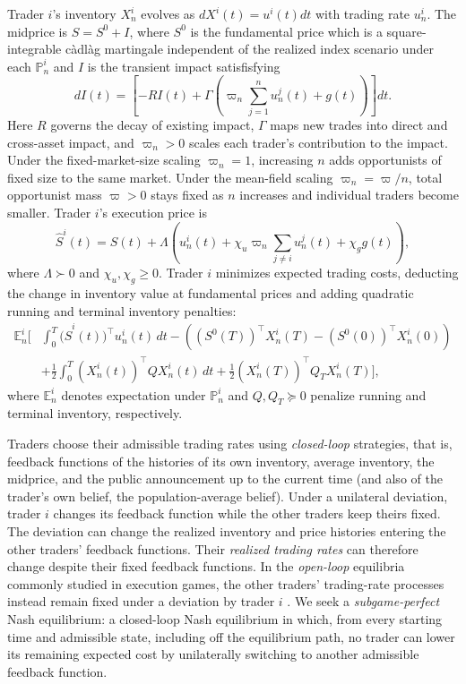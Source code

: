 \documentclass[12pt]{article}
\numberwithin{equation}{section}
\theoremstyle{definition}
\begin{document}
Trader \(i\)'s inventory \(X_n^i\) evolves as \(dX^i(t)=u^i(t)dt\) with trading rate \(u_n^i\).
The midprice is \(S=S^0+I\), where \(S^0\) is the fundamental price which is a square-integrable c\`adl\`ag
martingale independent of the realized index scenario under each \(\mathbb P_n^i\) and
\(I\) is the transient impact satisfisfying
\begin{equation}\label{eq:intro_dynamics}
dI(t)=\left[-RI(t)+\Gamma\left(\varpi_n\sum_{j=1}^n u_n^j(t)+g(t)\right)\right]dt.
\end{equation}
Here \(R\) governs the decay 
of existing impact, \(\Gamma\) maps new trades into direct and
cross-asset impact, and \(\varpi_n>0\) scales each trader's contribution to the impact.
Under the fixed-market-size scaling \(\varpi_n=1\), increasing \(n\)
adds opportunists of fixed size to the same market. Under the mean-field
scaling \(\varpi_n=\varpi/n\), total opportunist mass \(\varpi>0\)
stays fixed as \(n\) increases and individual traders become smaller.
Trader \(i\)'s execution price is
\[
\widehat S^i(t)=S(t)+\Lambda\left(u_n^i(t)
+\chi_u\varpi_n\sum_{j\ne i}u_n^j(t)+\chi_g g(t)\right),
\]
where \(\Lambda\succ0\) and \(\chi_u,\chi_g\geq0\).
Trader \(i\) minimizes expected trading costs, deducting the change in
inventory value at fundamental prices and adding quadratic running and
terminal inventory penalties:
\[
\begin{aligned}
\mathbb E_n^i\Bigg[
&\int_0^T \big(\widehat S^i(t)\big)^\top u_n^i(t)\,dt
-\left((S^0(T))^\top X_n^i(T)-(S^0(0))^\top X_n^i(0)\right)\\
&+\frac{1}{2}\int_0^T (X_n^i(t))^\top Q X_n^i(t)\,dt
+\frac{1}{2}(X_n^i(T))^\top Q_T X_n^i(T)
\Bigg],
\end{aligned}
\]
where \(\mathbb E_n^i\) denotes expectation under \(\mathbb P_n^i\)
and \(Q,Q_T\succeq0\) penalize running and terminal inventory, respectively.

Traders choose their admissible trading rates using \emph{closed-loop} strategies,
that is, feedback functions of the
histories of its own inventory, average inventory, the midprice, and the
public announcement up to the current time (and also of the trader's own belief, the population-average belief). Under a unilateral deviation,
trader \(i\) changes its feedback function while the other traders keep
theirs fixed. The deviation can change the realized inventory and price
histories entering the other traders' feedback functions. Their
\emph{realized trading rates} can therefore change despite their fixed
feedback functions. In the \emph{open-loop} equilibria commonly studied in
execution games, the other traders' trading-rate processes instead remain
fixed under a deviation by trader \(i\)
\citep{strehle_2017,NeumanVoss2023}.
We seek a \emph{subgame-perfect} Nash equilibrium: a closed-loop Nash equilibrium
in which, from every starting time and admissible state, including off the
equilibrium path, no trader can lower its remaining expected cost by
unilaterally switching to another admissible feedback function.
\end{document}
